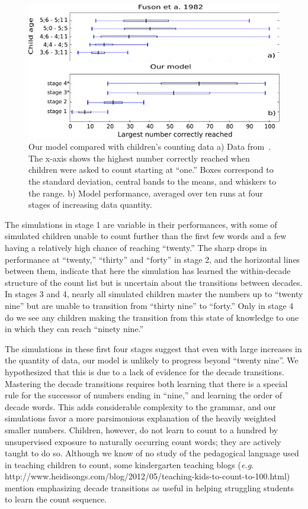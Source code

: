 \documentclass[10pt,letterpaper]{article}
\begin{document}
\begin{figure}[t]
  \includegraphics[width=0.9\linewidth]{figures/modelboxplot.pdf}
  \caption{Our model compared with children's counting data a) Data
    from~\citet{FusRicBriar1982}. The x-axis shows the highest number
    correctly reached when children were asked to count starting at
    ``one.'' Boxes correspond to the standard deviation, central bands
    to the means, and whiskers to the range. b) Model performance,
    averaged over ten runs at four stages of increasing data
    quantity.}\label{fig:fuson_model_comparison}
\end{figure}


The simulations in stage 1 are variable in their performances, with
some of simulated children unable to count further than the first few
words and a few having a relatively high chance of reaching
``twenty.'' The sharp drops in performance at ``twenty,'' ``thirty''
and ``forty'' in stage 2, and the horizontal lines between them,
indicate that here the simulation has learned the within-decade
structure of the count list but is uncertain about the transitions
between decades. In stages 3 and 4, nearly all simulated children
master the numbers up to ``twenty nine'' but are unable to transition
from ``thirty nine'' to ``forty.'' Only in stage 4 do we see any
children making the transition from this state of knowledge to one in
which they can reach ``ninety nine.''

The simulations in these first four stages suggest that even with
large increases in the quantity of data, our model is unlikely to
progress beyond ``twenty nine''. We hypothesized that this is due to a
lack of evidence for the decade transitions. Mastering the decade
transitions requires both learning that there is a special rule for
the successor of numbers ending in ``nine,'' and learning the order of
decade words. This adds considerable complexity to the grammar, and
our simulations favor a more parsimonious explanation of the heavily
weighted smaller numbers. Children, however, do not learn to count to
a hundred by unsupervised exposure to naturally occurring count words;
they are actively taught to do so. Although we know of no study of the
pedagogical language used in teaching children to count, some
kindergarten teaching blogs ({\it e.g.}
http://www.heidisongs.com/blog/2012/05/teaching-kids-to-count-to-100.html)
mention emphasizing decade transitions as useful in helping struggling
students to learn the count sequence.
\end{document}
